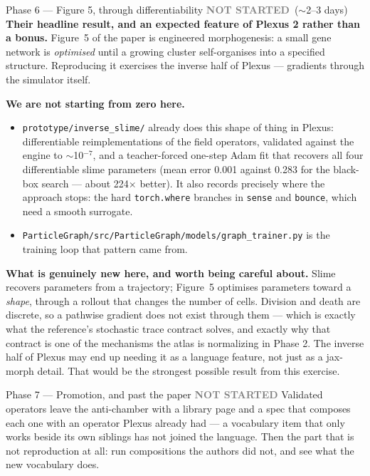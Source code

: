 \documentclass[11pt,a4paper]{article}
\newcommand{\code}[1]{\texttt{#1}}
\newcommand{\todo}{\textcolor{grey}{\textbf{NOT STARTED}}}
\begin{document}
\begin{phasebox}{Phase 6 --- Figure 5, through differentiability \hfill \todo\ ($\sim$2--3 days)}
\textbf{Their headline result, and an expected feature of Plexus 2 rather than a bonus.}
Figure~5 of the paper is engineered morphogenesis: a small gene network is \emph{optimised} until
a growing cluster self-organises into a specified structure. Reproducing it exercises the inverse
half of Plexus --- gradients through the simulator itself.

\textbf{We are not starting from zero here.}
\begin{itemize}
\item \code{prototype/inverse\_slime/} already does this shape of thing in Plexus: differentiable
reimplementations of the field operators, validated against the engine to $\sim$10$^{-7}$, and a
teacher-forced one-step Adam fit that recovers all four differentiable slime parameters
(mean error 0.001 against 0.283 for the black-box search --- about 224$\times$ better). It also
records precisely where the approach stops: the hard \code{torch.where} branches in \code{sense}
and \code{bounce}, which need a smooth surrogate.
\item \code{ParticleGraph/src/ParticleGraph/models/graph\_trainer.py} is the training loop that
pattern came from.
\end{itemize}

\textbf{What is genuinely new here, and worth being careful about.} Slime recovers parameters from
a trajectory; Figure~5 optimises parameters toward a \emph{shape}, through a rollout that changes
the number of cells. Division and death are discrete, so a pathwise gradient does not exist
through them --- which is exactly what the reference's stochastic trace contract solves, and
exactly why that contract is one of the mechanisms the atlas is normalizing in Phase 2. The
inverse half of Plexus may end up needing it as a language feature, not just as a jax-morph
detail. That would be the strongest possible result from this exercise.
\end{phasebox}

\begin{phasebox}{Phase 7 --- Promotion, and past the paper \hfill \todo}
Validated operators leave the anti-chamber with a library page and a spec that composes each one
with an operator Plexus already had --- a vocabulary item that only works beside its own siblings
has not joined the language. Then the part that is not reproduction at all: run compositions the
authors did not, and see what the new vocabulary does.
\end{phasebox}
\end{document}
